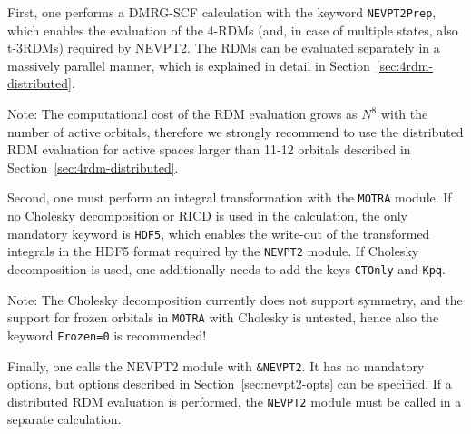 \documentclass[bibliography=totoc,12pt,a4paper]{scrartcl}
\newcommand{\kwd}[1]{\texttt{#1}}
\begin{document}
First, one performs a DMRG-SCF calculation with the keyword \kwd{NEVPT2Prep}, which enables the evaluation of the 4-RDMs (and, in case of multiple states, also t-3RDMs) required by NEVPT2. The RDMs can be evaluated separately in a massively parallel manner, which is explained in detail in Section~\ref{sec:4rdm-distributed}.

\begin{framed}
 \noindent Note: The computational cost of the RDM evaluation grows as $N^8$ with the number of active orbitals, therefore we strongly recommend to use the distributed RDM evaluation for active spaces larger than 11-12 orbitals described in Section~\ref{sec:4rdm-distributed}.
\end{framed}

Second, one must perform an integral transformation with the \kwd{MOTRA} module. If no Cholesky decomposition or RICD is used in the calculation, the only mandatory keyword is \kwd{HDF5}, which enables the write-out of the transformed integrals in the HDF5 format required by the \kwd{NEVPT2} module. If Cholesky decomposition is used, one additionally needs to add the keys \kwd{CTOnly} and \kwd{Kpq}.

\begin{framed}
 \noindent Note: The Cholesky decomposition currently does not support symmetry, and the support for frozen orbitals in \kwd{MOTRA} with Cholesky is untested, hence also the keyword \kwd{Frozen=0} is recommended!
\end{framed}

Finally, one calls the NEVPT2 module with \kwd{\&NEVPT2}. It has no mandatory options, but options described in Section~\ref{sec:nevpt2-opts} can be specified. If a distributed RDM evaluation is performed, the \kwd{NEVPT2} module must be called in a separate calculation.
\end{document}
